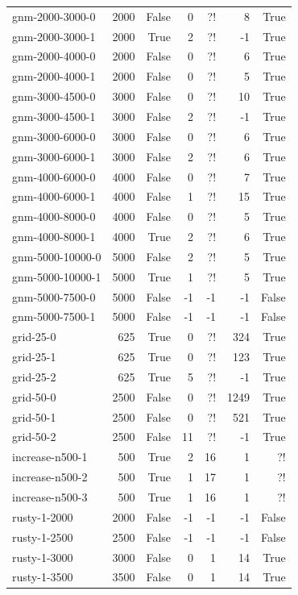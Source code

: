 \begin{tabular}{lrrrrrr}
gnm-2000-3000-0 & 2000 & False & 0 & ?! & 8 & True \\
gnm-2000-3000-1 & 2000 & True & 2 & ?! & -1 & True \\
gnm-2000-4000-0 & 2000 & False & 0 & ?! & 6 & True \\
gnm-2000-4000-1 & 2000 & False & 0 & ?! & 5 & True \\
gnm-3000-4500-0 & 3000 & False & 0 & ?! & 10 & True \\
gnm-3000-4500-1 & 3000 & False & 2 & ?! & -1 & True \\
gnm-3000-6000-0 & 3000 & False & 0 & ?! & 6 & True \\
gnm-3000-6000-1 & 3000 & False & 2 & ?! & 6 & True \\
gnm-4000-6000-0 & 4000 & False & 0 & ?! & 7 & True \\
gnm-4000-6000-1 & 4000 & False & 1 & ?! & 15 & True \\
gnm-4000-8000-0 & 4000 & False & 0 & ?! & 5 & True \\
gnm-4000-8000-1 & 4000 & True & 2 & ?! & 6 & True \\
gnm-5000-10000-0 & 5000 & False & 2 & ?! & 5 & True \\
gnm-5000-10000-1 & 5000 & True & 1 & ?! & 5 & True \\
gnm-5000-7500-0 & 5000 & False & -1 & -1 & -1 & False \\
gnm-5000-7500-1 & 5000 & False & -1 & -1 & -1 & False \\
grid-25-0 & 625 & True & 0 & ?! & 324 & True \\
grid-25-1 & 625 & True & 0 & ?! & 123 & True \\
grid-25-2 & 625 & True & 5 & ?! & -1 & True \\
grid-50-0 & 2500 & False & 0 & ?! & 1249 & True \\
grid-50-1 & 2500 & False & 0 & ?! & 521 & True \\
grid-50-2 & 2500 & False & 11 & ?! & -1 & True \\
increase-n500-1 & 500 & True & 2 & 16 & 1 & ?! \\
increase-n500-2 & 500 & True & 1 & 17 & 1 & ?! \\
increase-n500-3 & 500 & True & 1 & 16 & 1 & ?! \\
rusty-1-2000 & 2000 & False & -1 & -1 & -1 & False \\
rusty-1-2500 & 2500 & False & -1 & -1 & -1 & False \\
rusty-1-3000 & 3000 & False & 0 & 1 & 14 & True \\
rusty-1-3500 & 3500 & False & 0 & 1 & 14 & True \\

\end{tabular}
